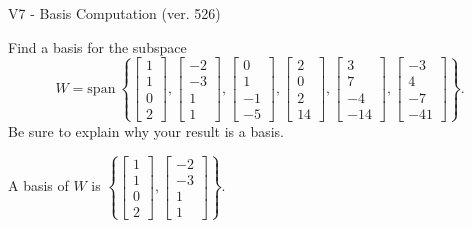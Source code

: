 \begin{exercise}
  \begin{exerciseTitle}V7 - Basis Computation (ver. 526)\end{exerciseTitle}
  \begin{exerciseStatement}
    Find a basis for the subspace 
\[W=\mathrm{span}\ \left\{\left[\begin{array}{r}
1 \\
1 \\
0 \\
2
\end{array}\right] , \left[\begin{array}{r}
-2 \\
-3 \\
1 \\
1
\end{array}\right] , \left[\begin{array}{r}
0 \\
1 \\
-1 \\
-5
\end{array}\right] , \left[\begin{array}{r}
2 \\
0 \\
2 \\
14
\end{array}\right] , \left[\begin{array}{r}
3 \\
7 \\
-4 \\
-14
\end{array}\right] , \left[\begin{array}{r}
-3 \\
4 \\
-7 \\
-41
\end{array}\right]\right\}.\]
 Be sure to explain why your result is a basis.


  \end{exerciseStatement}
  \begin{exerciseAnswer}
   A basis of \(W\) is  \(\left\{\left[\begin{array}{r}
1 \\
1 \\
0 \\
2
\end{array}\right] , \left[\begin{array}{r}
-2 \\
-3 \\
1 \\
1
\end{array}\right]\right\}\).
  


  \end{exerciseAnswer}
\end{exercise}